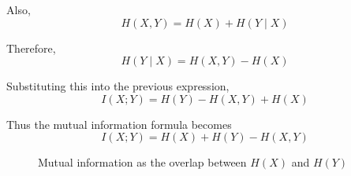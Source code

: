 \documentclass[11pt,a4paper]{book}
\begin{document}
Also,
\[
H(X,Y) = H(X) + H(Y \mid X)
\]

Therefore,
\[
H(Y \mid X) = H(X,Y) - H(X)
\]

Substituting this into the previous expression,
\[
I(X;Y) = H(Y) - H(X,Y) + H(X)
\]

Thus the mutual information formula becomes
\[
I(X;Y) = H(X) + H(Y) - H(X,Y)
\]

\begin{figure}[H]
    \centering
    \caption{Mutual information as the overlap between $H(X)$ and $H(Y)$}
\end{figure}
\end{document}
